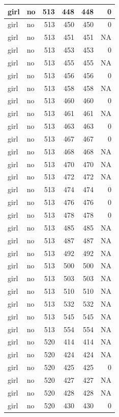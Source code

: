 \documentclass[man]{apa6}
\begin{document}
\begin{tabular}{l|l|r|r|r|r}
\hline
girl & no & 513 & 448 & 448 & 0\\
\hline
girl & no & 513 & 450 & 450 & 0\\
\hline
girl & no & 513 & 451 & 451 & NA\\
\hline
girl & no & 513 & 453 & 453 & 0\\
\hline
girl & no & 513 & 455 & 455 & NA\\
\hline
girl & no & 513 & 456 & 456 & 0\\
\hline
girl & no & 513 & 458 & 458 & NA\\
\hline
girl & no & 513 & 460 & 460 & 0\\
\hline
girl & no & 513 & 461 & 461 & NA\\
\hline
girl & no & 513 & 463 & 463 & 0\\
\hline
girl & no & 513 & 467 & 467 & 0\\
\hline
girl & no & 513 & 468 & 468 & NA\\
\hline
girl & no & 513 & 470 & 470 & NA\\
\hline
girl & no & 513 & 472 & 472 & NA\\
\hline
girl & no & 513 & 474 & 474 & 0\\
\hline
girl & no & 513 & 476 & 476 & 0\\
\hline
girl & no & 513 & 478 & 478 & 0\\
\hline
girl & no & 513 & 485 & 485 & NA\\
\hline
girl & no & 513 & 487 & 487 & NA\\
\hline
girl & no & 513 & 492 & 492 & NA\\
\hline
girl & no & 513 & 500 & 500 & NA\\
\hline
girl & no & 513 & 503 & 503 & NA\\
\hline
girl & no & 513 & 510 & 510 & NA\\
\hline
girl & no & 513 & 532 & 532 & NA\\
\hline
girl & no & 513 & 545 & 545 & NA\\
\hline
girl & no & 513 & 554 & 554 & NA\\
\hline
girl & no & 520 & 414 & 414 & NA\\
\hline
girl & no & 520 & 424 & 424 & NA\\
\hline
girl & no & 520 & 425 & 425 & 0\\
\hline
girl & no & 520 & 427 & 427 & NA\\
\hline
girl & no & 520 & 428 & 428 & NA\\
\hline
girl & no & 520 & 430 & 430 & 0\\

\end{tabular}
\end{document}
